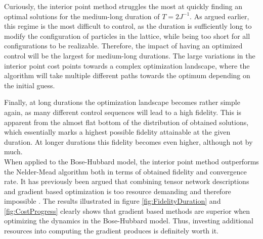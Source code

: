 Curiously, the interior point method struggles the most at quickly finding an optimal solutions for the medium-long duration of $T = 2 J^{-1}$. As argued earlier, this regime is the most difficult to control, as the duration is sufficiently long to modify the configuration of particles in the lattice, while being too short for all configurations to be realizable. Therefore, the impact of having an optimized control will be the largest for medium-long durations. The large variations in the interior point cost points towards a complex optimization landscape, where the algorithm will take multiple different paths towards the optimum depending on the initial guess.

Finally, at long durations the optimization landscape becomes rather simple again, as many different control sequences will lead to a high fidelity. This is apparent from the almost flat bottom of the distribution of obtained solutions, which essentially marks a highest possible fidelity attainable at the given duration. At longer durations this fidelity becomes even higher, although not by much.\\

When applied to the Bose-Hubbard model, the interior point method outperforms the Nelder-Mead algorithm both in terms of obtained fidelity and convergence rate. It has previously been argued that combining tensor network descriptions and gradient based optimization is too resource demanding and therefore impossible \cite{Doria2011}. The results illustrated in figure \ref{fig:FidelityDuration} and \ref{fig:CostProgress} clearly shows that gradient based methods are superior when optimizing the dynamics in the Bose-Hubbard model. Thus, investing additional resources into computing the gradient produces is definitely worth it.


